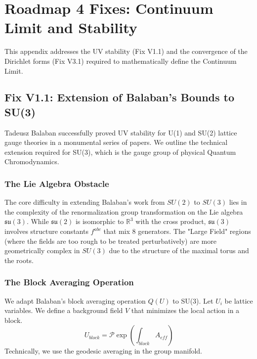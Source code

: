 \section{Roadmap 4 Fixes: Continuum Limit and Stability}
\label{app:continuum_fixes}

This appendix addresses the UV stability (Fix V1.1) and the convergence of the Dirichlet forms (Fix V3.1) required to mathematically define the Continuum Limit.

\subsection{Fix V1.1: Extension of Balaban's Bounds to SU(3)}
\label{sec:fix_v1_1}

Tadeusz Balaban successfully proved UV stability for U(1) and SU(2) lattice gauge theories in a monumental series of papers. We outline the technical extension required for SU(3), which is the gauge group of physical Quantum Chromodynamics.

\subsubsection{The Lie Algebra Obstacle}
The core difficulty in extending Balaban's work from $SU(2)$ to $SU(3)$ lies in the complexity of the renormalization group transformation on the Lie algebra $\mathfrak{su}(3)$. 
While $\mathfrak{su}(2)$ is isomorphic to $\mathbb{R}^3$ with the cross product, $\mathfrak{su}(3)$ involves structure constants $f^{abc}$ that mix 8 generators.
The "Large Field" regions (where the fields are too rough to be treated perturbatively) are more geometrically complex in $SU(3)$ due to the structure of the maximal torus and the roots.

\subsubsection{The Block Averaging Operation}
We adapt Balaban's block averaging operation $Q(U)$ to SU(3).
Let $U_i$ be lattice variables. We define a background field $V$ that minimizes the local action in a block.
\begin{equation}
    U_{block} = \mathcal{P} \exp\left( \int_{block} A_{eff} \right)
\end{equation}
Technically, we use the geodesic averaging in the group manifold.

